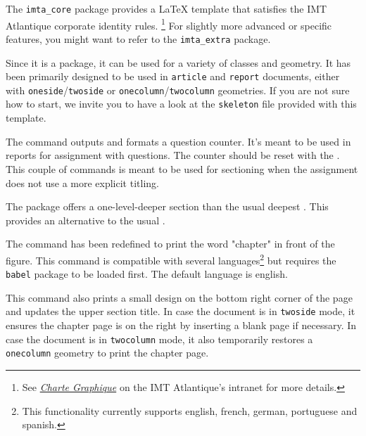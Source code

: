 \documentclass{report}
\begin{document}
The \texttt{imta\_core} package provides a \LaTeX{} template that satisfies the IMT Atlantique corporate identity rules.
\footnote{See \textit{\href{https://intranet.imt-atlantique.fr/wp-content/uploads/2017/01/imt_atlantique_chartegraphique.pdf}{Charte Graphique}} on the IMT Atlantique's intranet for more details.} 
For slightly more advanced or specific features, you might want to refer to the \texttt{imta\_extra} package.

Since it is a package, it can be used for a variety of classes and geometry. 
It has been primarily designed to be used in \texttt{article} and \texttt{report} documents, either with \texttt{oneside}/\texttt{twoside} or \texttt{onecolumn}/\texttt{twocolumn} geometries. 
If you are not sure how to start, we invite you to have a look at the \texttt{skeleton} file provided with this template.

The  command outputs and formats a question counter.
It's meant to be used in reports for assignment with questions.
The counter should be reset with the .
This couple of commands is meant to be used for sectioning when the assignment does not use a more explicit titling.


The  package offers a one-level-deeper section than the usual deepest .
This provides an alternative to the usual .


The  command has been redefined to print the word "chapter" in front of the figure. 
This command is compatible with several languages\footnote{This functionality currently supports english, french, german, portuguese and spanish.} but requires the \texttt{babel} package to be loaded first. 
The default language is english.

This command also prints a small design on the bottom right corner of the page and updates the upper section title. 
In case the document is in \texttt{twoside} mode, it ensures the chapter page is on the right by inserting a blank page if necessary. 
In case the document is in \texttt{twocolumn} mode, it also temporarily restores a \texttt{onecolumn} geometry to print the chapter page.
\end{document}
